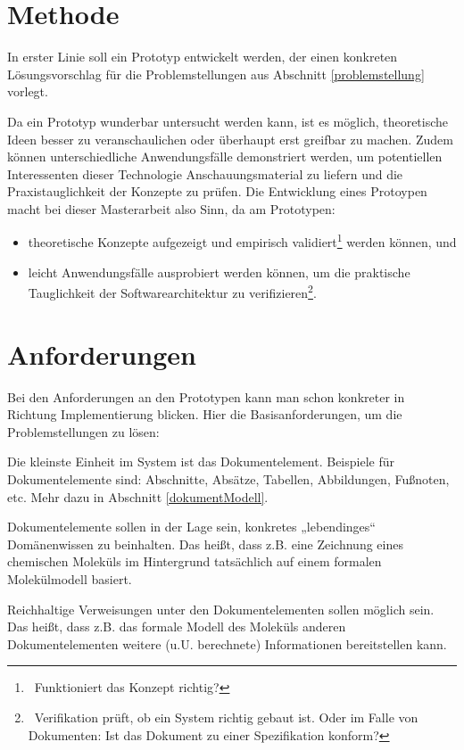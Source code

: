  
\section{Methode}\label{}
 
In erster Linie soll ein Prototyp entwickelt werden, der einen konkreten Lösungsvorschlag für die Problemstellungen aus Abschnitt \ref{problemstellung} vorlegt.

 
Da ein Prototyp wunderbar untersucht werden kann, ist es möglich, theoretische Ideen besser zu veranschaulichen oder überhaupt erst greifbar zu machen. Zudem können unterschiedliche Anwendungsfälle demonstriert werden, um potentiellen Interessenten dieser Technologie Anschauungsmaterial zu liefern und die Praxistauglichkeit der Konzepte zu prüfen. Die Entwicklung eines Protoypen macht bei dieser Masterarbeit also Sinn, da am Prototypen:

 
\begin{itemize}

\item theoretische Konzepte aufgezeigt und empirisch validiert\footnote{~Funktioniert das Konzept richtig?} werden können, und
\item leicht Anwendungsfälle ausprobiert werden können, um die praktische Tauglichkeit der Softwarearchitektur zu verifizieren\footnote{~Verifikation prüft, ob ein System richtig gebaut ist. Oder im Falle von Dokumenten: Ist das Dokument zu einer Spezifikation konform?}.
\end{itemize}
 
\section{Anforderungen}\label{anforderungen-sec}
 
Bei den Anforderungen an den Prototypen kann man schon konkreter in Richtung Implementierung blicken. Hier die Basisanforderungen, um die Problemstellungen zu lösen:

 
Die kleinste Einheit im System ist das Dokumentelement. Beispiele für Dokumentelemente sind: Abschnitte, Absätze, Tabellen, Abbildungen, Fußnoten, etc. Mehr dazu in Abschnitt \ref{dokumentModell}.

 
Dokumentelemente sollen in der Lage sein, konkretes „lebendinges“ Domänenwissen zu beinhalten. Das heißt, dass z.B. eine Zeichnung eines chemischen Moleküls im Hintergrund tatsächlich auf einem formalen Molekülmodell basiert.

 
Reichhaltige Verweisungen unter den Dokumentelementen sollen möglich sein. Das heißt, dass z.B. das formale Modell des Moleküls anderen Dokumentelementen weitere (u.U. berechnete) Informationen bereitstellen kann.


